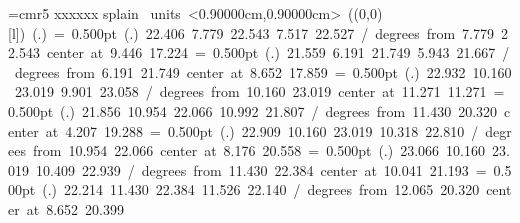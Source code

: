 \documentclass[10pt]{article}
\begin{document}
%
%
%
\noindent \font\thinlinefont=cmr5
%
\begingroup\makeatletter\ifx\SetFigFont\undefined
\def\x#1#2#3#4#5#6#7\relax{\def\x{#1#2#3#4#5#6}}%
\expandafter\x\fmtname xxxxxx\relax \def\y{splain}%
\ifx\x\y   %
\gdef\SetFigFont#1#2#3{%
  \ifnum #1<17\tiny\else \ifnum #1<20\small\else
  \ifnum #1<24\normalsize\else \ifnum #1<29\large\else
  \ifnum #1<34\Large\else \ifnum #1<41\LARGE\else
     \huge\fi\fi\fi\fi\fi\fi
  \csname #3\endcsname}%
\else
\gdef\SetFigFont#1#2#3{\begingroup
  \count@#1\relax \ifnum 25<\count@\count@25\fi
  \def\x{\endgroup\@setsize\SetFigFont{#2pt}}%
  \expandafter\x
    \csname \romannumeral\the\count@ pt\expandafter\endcsname
    \csname @\romannumeral\the\count@ pt\endcsname
  \csname #3\endcsname}%
\fi
\fi\endgroup
\mbox{\beginpicture
\setcoordinatesystem units <0.90000cm,0.90000cm>
\unitlength=1.00000cm
\linethickness=1pt
\setplotsymbol ({\makebox(0,0)[l]{\tencirc{}}})
\setshadesymbol ({\thinlinefont .})
\setlinear
%
%
\linethickness= 0.500pt
\setplotsymbol ({\thinlinefont .})
%
%
 22.406  7.779 22.543  7.517 22.527 /
%
 degrees from  7.779 22.543 center at  9.446 17.224
%
%
\linethickness= 0.500pt
\setplotsymbol ({\thinlinefont .})
%
%
 21.559  6.191 21.749  5.943 21.667 /
%
 degrees from  6.191 21.749 center at  8.652 17.859
%
%
\linethickness= 0.500pt
\setplotsymbol ({\thinlinefont .})
%
%
 22.932 10.160 23.019  9.901 23.058 /
%
 degrees from 10.160 23.019 center at 11.271 11.271
%
%
\linethickness= 0.500pt
\setplotsymbol ({\thinlinefont .})
%
%
 21.856 10.954 22.066 10.992 21.807 /
%
 degrees from 11.430 20.320 center at  4.207 19.288
%
%
\linethickness= 0.500pt
\setplotsymbol ({\thinlinefont .})
%
%
 22.909 10.160 23.019 10.318 22.810 /
%
 degrees from 10.954 22.066 center at  8.176 20.558
%
%
\linethickness= 0.500pt
\setplotsymbol ({\thinlinefont .})
%
%
 23.066 10.160 23.019 10.409 22.939 /
%
 degrees from 11.430 22.384 center at 10.041 21.193
%
%
\linethickness= 0.500pt
\setplotsymbol ({\thinlinefont .})
%
%
 22.214 11.430 22.384 11.526 22.140 /
%
 degrees from 12.065 20.320 center at  8.652 20.399
}
\end{document}
